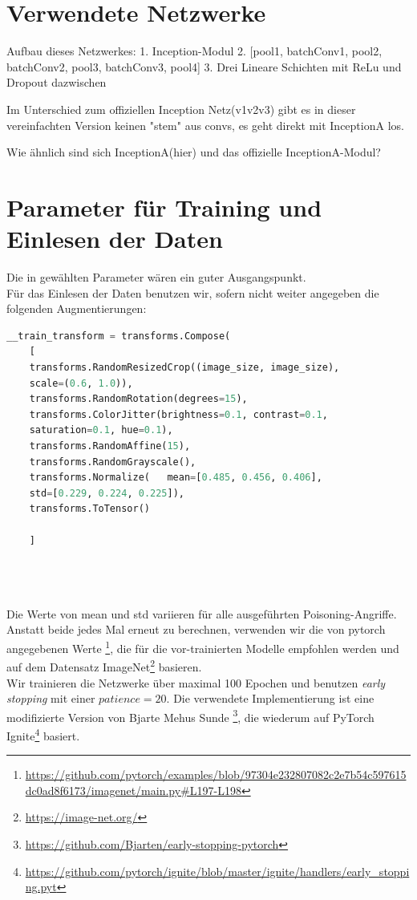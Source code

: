 \documentclass[11pt,a4paper]{article}
\numberwithin{equation}{section}
\begin{document}
	
	
	\newpage
	\appendix
	\section{Verwendete Netzwerke}
	
	Aufbau dieses Netzwerkes:
	1. Inception-Modul
	2. [pool1, batchConv1, pool2, batchConv2, pool3, batchConv3, pool4]
	3. Drei Lineare Schichten mit ReLu und Dropout dazwischen
	
	Im Unterschied zum offiziellen Inception Netz(v1v2v3) gibt es in dieser 
	vereinfachten Version keinen "stem" aus convs, 
	es geht direkt mit InceptionA los.
	
	Wie ähnlich sind sich InceptionA(hier) und das offizielle InceptionA-Modul?
	
	\section{Parameter für Training und Einlesen der Daten}\label{param_net}
	Die in \cite{CH} gewählten Parameter wären ein guter Ausgangspunkt.\\
	Für das Einlesen der Daten benutzen wir, sofern nicht weiter angegeben die folgenden Augmentierungen:
	
	\begin{lstlisting}[language=Python, caption=Augemntierung beim Einlesen der Daten]
	__train_transform = transforms.Compose(
	[
	transforms.RandomResizedCrop((image_size, image_size), 
	scale=(0.6, 1.0)),
	transforms.RandomRotation(degrees=15),
	transforms.ColorJitter(brightness=0.1, contrast=0.1, 
	saturation=0.1, hue=0.1),
	transforms.RandomAffine(15),
	transforms.RandomGrayscale(),
	transforms.Normalize(	mean=[0.485, 0.456, 0.406], 
	std=[0.229, 0.224, 0.225]),
	transforms.ToTensor()
	
	]
	
	
	
	\end{lstlisting}
	Die Werte von mean und std variieren für alle ausgeführten Poisoning-Angriffe. Anstatt beide jedes Mal erneut zu berechnen, verwenden wir die von pytorch angegebenen Werte \footnote{\url{https://github.com/pytorch/examples/blob/97304e232807082c2e7b54c597615dc0ad8f6173/imagenet/main.py\#L197-L198}}, die für die vor-trainierten Modelle empfohlen werden und auf dem Datensatz ImageNet\footnote{\url{https://image-net.org/}} basieren.\\ 
	Wir trainieren die Netzwerke über maximal 100 Epochen und benutzen \textit{early stopping} mit einer $patience=20$. Die verwendete Implementierung ist eine modifizierte Version von Bjarte Mehus Sunde \footnote{\url{https://github.com/Bjarten/early-stopping-pytorch}}, die wiederum auf PyTorch Ignite\footnote{\url{https://github.com/pytorch/ignite/blob/master/ignite/handlers/early\_stopping.pyt}} basiert.\\
	
\end{document}
